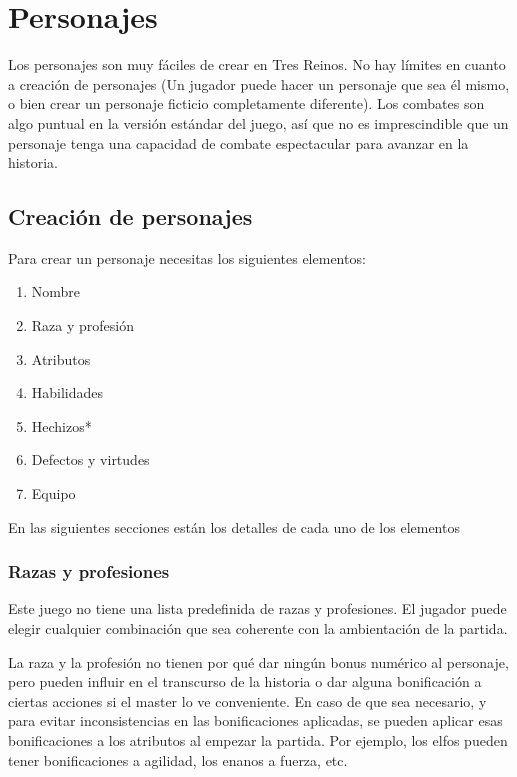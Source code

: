 \chapter{Personajes}

Los personajes son muy fáciles de crear en Tres Reinos. No hay límites en cuanto a creación de personajes (Un jugador puede hacer un personaje que sea él mismo, o bien crear un personaje ficticio completamente diferente). Los combates son algo puntual en la versión estándar del juego, así que no es imprescindible que un personaje tenga una capacidad de combate espectacular para avanzar en la historia. 

\section{Creación de personajes}

Para crear un personaje necesitas los siguientes elementos:

\begin{enumerate}
\item Nombre
\item Raza y profesión
\item Atributos
\item Habilidades
\item Hechizos*
\item Defectos y virtudes
\item Equipo
\end{enumerate}

En las siguientes secciones están los detalles de cada uno de los elementos

\subsection{Razas y profesiones}

Este juego no tiene una lista predefinida de razas y profesiones. El jugador puede elegir cualquier combinación que sea coherente con la ambientación de la partida. 
\par
La raza y la profesión no tienen por qué dar ningún bonus numérico al personaje, pero pueden influir en el transcurso de la historia o dar alguna bonificación a ciertas acciones si el master lo ve conveniente. En caso de que sea necesario, y para evitar inconsistencias en las bonificaciones aplicadas, se pueden aplicar esas bonificaciones a los atributos al empezar la partida. Por ejemplo, los elfos pueden tener bonificaciones a agilidad, los enanos a fuerza, etc.

